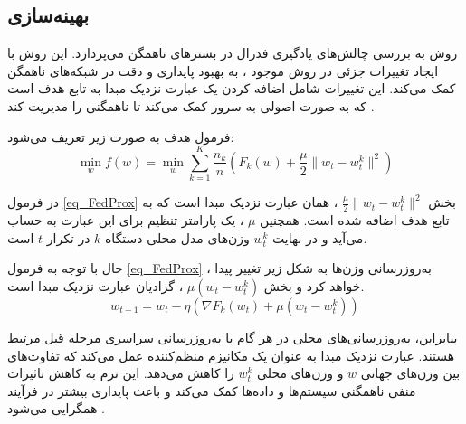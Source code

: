 \subsection{
بهینه‌سازی
}
روش
به بررسی چالش‌های یادگیری فدرال در بسترهای ناهمگن می‌پردازد. این روش با ایجاد تغییرات جزئی در روش موجود
%
، به بهبود پایداری و دقت در شبکه‌های ناهمگن کمک می‌کند. این تغییرات شامل اضافه کردن یک عبارت نزدیک مبدا%
به تابع هدف است که به صورت اصولی به سرور کمک می‌کند تا ناهمگنی را مدیریت کند
\cite{li2020federatedheteroneneous}.

فرمول هدف
به صورت زیر تعریف می‌شود:
\begin{equation}
\min_{w} f(w) = \min_{w} \sum_{k=1}^{K} \frac{n_k}{n} \left( F_k(w) + \frac{\mu}{2} \|w_t - w_t^k\|^2 \right)
\label{eq_FedProx}
\end{equation}

در فرمول
\ref{eq_FedProx}
بخش
$\frac{\mu}{2} \|w_t - w_t^k\|^2$%
، همان عبارت نزدیک مبدا است که به تابع هدف اضافه شده است. همچنین
$\mu$%
، یک پارامتر تنظیم برای این عبارت به حساب می‌آید و در نهایت
$w_t^k$
وزن‌های مدل محلی دستگاه
$k$
در تکرار
$t$
است.

حال با توجه به فرمول
\ref{eq_FedProx}%
، به‌روزرسانی وزن‌ها به شکل زیر تغییر پیدا خواهد کرد و بخش
$\mu (w_t - w_t^k)$%
، گرادیان عبارت نزدیک مبدا است.
\begin{equation*}
w_{t+1} = w_t - \eta (\nabla F_k(w_t) + \mu (w_t - w_t^k))
\end{equation*}

بنابراین، به‌روزرسانی‌های محلی در هر گام با به‌روزرسانی سراسری مرحله قبل مرتبط هستند. عبارت نزدیک مبدا به عنوان یک مکانیزم منظم‌کننده%
عمل می‌کند که تفاوت‌های بین وزن‌های جهانی
$w$
و وزن‌های محلی
$w_t^k$
را کاهش می‌دهد. این ترم به کاهش تاثیرات منفی ناهمگنی سیستم‌ها و داده‌ها کمک می‌کند و باعث پایداری بیشتر در فرآیند همگرایی می‌شود
\cite{li2020federatedheteroneneous}.

